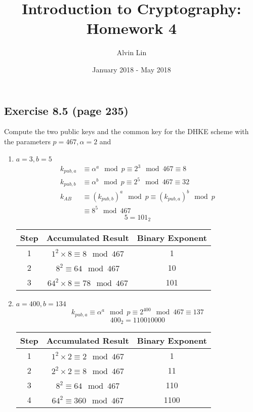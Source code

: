 \documentclass{math}
\title{Introduction to Cryptography: Homework 4}
\author{Alvin Lin}
\date{January 2018 - May 2018}
\begin{document}
\maketitle

\subsection*{Exercise 8.5 (page 235)}
Compute the two public keys and the common key for the DHKE scheme with
the parameters \( p = 467, \alpha = 2 \) and
\begin{enumerate}
  \item \( a = 3, b = 5 \)
  \begin{align*}
    k_{pub,a} &\equiv \alpha^a\mod p \equiv 2^3\mod467 \equiv 8 \\
    k_{pub,b} &\equiv \alpha^b\mod p \equiv 2^5\mod467 \equiv 32 \\
    k_{AB} &\equiv (k_{pub,b})^a\mod p \equiv (k_{pub,a})^b\mod p \\
    &\equiv 8^5\mod 467
  \end{align*}
  \[ 5 = 101_2 \]
  \begin{center}
    \begin{tabular}{|c|c|c|}
      \hline
      Step & Accumulated Result & Binary Exponent \\
      \hline
      1 & \( 1^2\times8 \equiv 8\mod467 \) & 1 \\
      \hline
      2 & \( 8^2 \equiv 64\mod467 \) & 10 \\
      \hline
      3 & \( 64^2\times8 \equiv 78\mod467 \) & 101 \\
      \hline
    \end{tabular}
  \end{center}
  \item \( a = 400, b = 134 \)
  \[ k_{pub,a} \equiv \alpha^a\mod p \equiv 2^{400}\mod467 \equiv 137 \]
  \[ 400_2 = 110010000 \]
  \begin{center}
    \begin{tabular}{|c|c|c|}
      \hline
      Step & Accumulated Result & Binary Exponent \\
      \hline
      1 & \( 1^2\times2 \equiv 2\mod467 \) & 1 \\
      \hline
      2 & \( 2^2\times2 \equiv 8\mod467 \) & 11 \\
      \hline
      3 & \( 8^2 \equiv 64\mod467 \) & 110 \\
      \hline
      4 & \( 64^2 \equiv 360\mod467 \) & 1100 \\

\end{tabular}
\end{center}
\end{enumerate}
\end{document}
